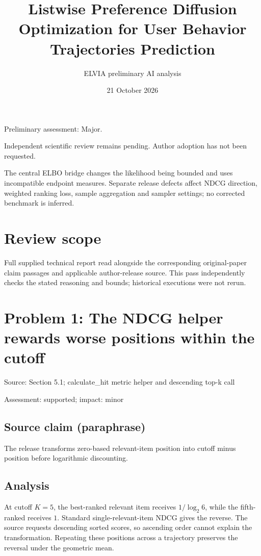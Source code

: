 \documentclass[11pt]{article}
\begin{document}
\title{Listwise Preference Diffusion Optimization for User Behavior Trajectories Prediction}

\author{ELVIA preliminary AI analysis}\date{21 October 2026}\maketitle

Preliminary assessment: Major.\par

Independent scientific review remains pending. Author adoption has not been requested.

The central ELBO bridge changes the likelihood being bounded and uses incompatible endpoint measures. Separate release defects affect NDCG direction, weighted ranking loss, sample aggregation and sampler settings; no corrected benchmark is inferred.

\section*{Review scope}

Full supplied technical report read alongside the corresponding original-paper claim passages and applicable author-release source. This pass independently checks the stated reasoning and bounds; historical executions were not rerun.

\section*{Problem 1: The NDCG helper rewards worse positions within the cutoff}

Source: Section 5.1; calculate\_hit metric helper and descending top-k call

Assessment: supported; impact: minor

\subsection*{Source claim (paraphrase)}

The release transforms zero-based relevant-item position into cutoff minus position before logarithmic discounting.

\subsection*{Analysis}

At cutoff \(K=5\), the best-ranked relevant item receives \(1/\log_2 6\), while the fifth-ranked receives \(1\). Standard single-relevant-item NDCG gives the reverse. The source requests descending sorted scores, so ascending order cannot explain the transformation. Repeating these positions across a trajectory preserves the reversal under the geometric mean.
\end{document}
